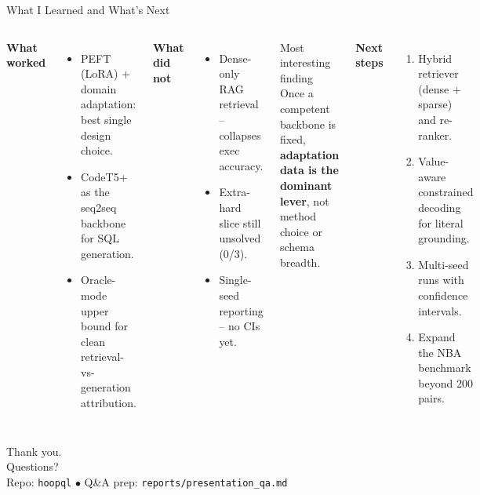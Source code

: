 \documentclass[aspectratio=169,11pt]{beamer}
\begin{document}
\begin{frame}{What I Learned and What's Next}
  \begin{columns}[T,onlytextwidth]
      \textbf{What worked}
      \begin{itemize}
        \item PEFT (LoRA) + domain adaptation: best single design choice.
        \item CodeT5+ as the seq2seq backbone for SQL generation.
        \item Oracle-mode upper bound for clean retrieval-vs-generation
              attribution.
      \end{itemize}

      \textbf{What did not}
      \begin{itemize}
        \item Dense-only RAG retrieval -- collapses exec accuracy.
        \item Extra-hard slice still unsolved (0/3).
        \item Single-seed reporting -- no CIs yet.
      \end{itemize}
      \begin{alertblock}{Most interesting finding}
        Once a competent backbone is fixed, \textbf{adaptation data is
        the dominant lever}, not method choice or schema breadth.
      \end{alertblock}
      \textbf{Next steps}
      \begin{enumerate}
        \item Hybrid retriever (dense + sparse) and re-ranker.
        \item Value-aware constrained decoding for literal grounding.
        \item Multi-seed runs with confidence intervals.
        \item Expand the NBA benchmark beyond 200 pairs.
      \end{enumerate}
  \end{columns}
\end{frame}

\begin{frame}[standout]
  Thank you.\\[6pt]
  {\normalsize Questions?}\\[10pt]
  {\footnotesize Repo: \texttt{hoopql} \quad$\bullet$\quad
   Q\&A prep: \texttt{reports/presentation\_qa.md}}
\end{frame}
\end{document}
